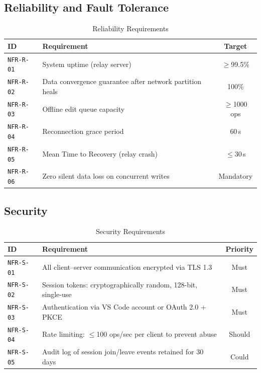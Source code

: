 \documentclass[12pt, a4paper, oneside]{article}
\newcommand{\reqid}[1]{\texttt{\textcolor{primaryblue}{#1}}}
\begin{document}
\subsection{Reliability and Fault Tolerance}

\begin{table}[H]
\centering
\caption{Reliability Requirements}
\begin{tabularx}{\textwidth}{l X c}
\toprule
\textbf{ID} & \textbf{Requirement} & \textbf{Target} \\
\midrule
\reqid{NFR-R-01} & System uptime (relay server) & $\geq$99.5\% \\
\reqid{NFR-R-02} & Data convergence guarantee after network partition heals & 100\% \\
\reqid{NFR-R-03} & Offline edit queue capacity & $\geq$1000 ops \\
\reqid{NFR-R-04} & Reconnection grace period & 60\,s \\
\reqid{NFR-R-05} & Mean Time to Recovery (relay crash) & $\leq$30\,s \\
\reqid{NFR-R-06} & Zero silent data loss on concurrent writes & Mandatory \\
\bottomrule
\end{tabularx}
\end{table}

\subsection{Security}

\begin{table}[H]
\centering
\caption{Security Requirements}
\begin{tabularx}{\textwidth}{l X c}
\toprule
\textbf{ID} & \textbf{Requirement} & \textbf{Priority} \\
\midrule
\reqid{NFR-S-01} & All client--server communication encrypted via TLS 1.3 & Must \\
\reqid{NFR-S-02} & Session tokens: cryptographically random, 128-bit, single-use & Must \\
\reqid{NFR-S-03} & Authentication via VS Code account or OAuth 2.0 + PKCE & Must \\
\reqid{NFR-S-04} & Rate limiting: $\leq$100 ops/sec per client to prevent abuse & Should \\
\reqid{NFR-S-05} & Audit log of session join/leave events retained for 30 days & Could \\
\bottomrule
\end{tabularx}
\end{table}
\end{document}
